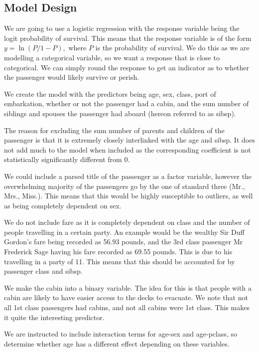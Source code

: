 \documentclass[9pt]{extarticle}
\begin{document}
\subsection{Model Design}

We are going to use a logistic regression with the response variable being the logit probability of survival. This means that the response variable is of the form $y = \ln(P/1-P),$ where $P$ is the probability of survival. We do this as we are modelling a categorical variable, so we want a response that is close to categorical. We can simply round the response to get an indicator as to whether the passenger would likely survive or perish.

We create the model with the predictors being age, sex, class, port of embarkation, whether or not the passenger had a cabin, and the sum number of siblings and spouses the passenger had aboard (hereon referred to as sibsp).

The reason for excluding the sum number of parents and children of the passenger is that it is extremely closely interlinked with the age and sibsp. It does not add much to the model when included as the corresponding coefficient is not statistically significantly different from 0.

We could include a parsed title of the passenger as a factor variable, however the overwhelming majority of the passengers go by the one of standard three (Mr., Mrs., Miss.). This means that this would be highly susceptible to outliers, as well as being completely dependent on sex.

We do not include fare as it is completely dependent on class and the number of people travelling in a certain party. An example would be the wealthy Sir Duff Gordon's fare being recorded as 56.93 pounds, and the 3rd class passenger Mr Frederick Sage having his fare recorded as 69.55 pounds. This is due to his travelling in a party of 11. This means that this should be accounted for by passenger class and sibsp.

We make the cabin into a binary variable. The idea for this is that people with a cabin are likely to have easier access to the decks to evacuate. We note that not all 1st class passengers had cabins, and not all cabins were 1st class. This makes it quite the interesting predictor.

We are instructed to include interaction terms for age-sex and age-pclass, so determine whether age has a different effect depending on these variables.
\end{document}
